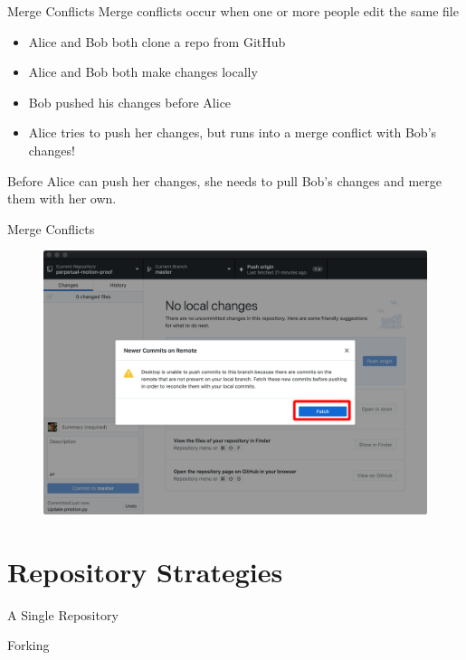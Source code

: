 \documentclass{beamer}
\begin{document}
    \begin{frame}{Merge Conflicts}
        Merge conflicts occur when one or more people edit the same file
        \begin{itemize}
            \item Alice and Bob both clone a repo from GitHub
            \item Alice and Bob both make changes locally
            \item Bob pushed his changes before Alice
            \item Alice tries to push her changes, but runs into a merge conflict with Bob's changes!
        \end{itemize}
        Before Alice can push her changes, she needs to pull Bob's changes and merge them with her own.
    \end{frame}

    \begin{frame}{Merge Conflicts}
        \begin{figure}
            \centering
            \includegraphics[width=\textwidth]{figures/merge_1.png}
        \end{figure}
    \end{frame}

    \section{Repository Strategies}
    \begin{frame}{A Single Repository}

    \end{frame}

    \begin{frame}{Forking}
    \end{frame}
\end{document}
